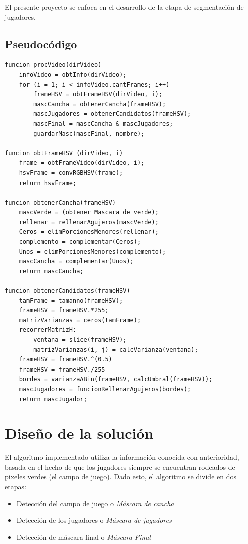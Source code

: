 \documentclass{IEEEtran}
\begin{document}
El presente proyecto se enfoca en el desarrollo de la etapa de segmentaci\'on de jugadores.

\subsection {Pseudoc\'odigo}
\begin{verbatim}
funcion procVideo(dirVideo)
	infoVideo = obtInfo(dirVideo);
	for (i = 1; i < infoVideo.cantFrames; i++)
		frameHSV = obtFrameHSV(dirVideo, i);
		mascCancha = obtenerCancha(frameHSV);
		mascJugadores = obtenerCandidatos(frameHSV);
		mascFinal = mascCancha & mascJugadores;
		guardarMasc(mascFinal, nombre);

funcion obtFrameHSV (dirVideo, i)
	frame = obtFrameVideo(dirVideo, i);
	hsvFrame = convRGBHSV(frame);
	return hsvFrame;

funcion obtenerCancha(frameHSV)
	mascVerde = (obtener Mascara de verde);
	rellenar = rellenarAgujeros(mascVerde);
	Ceros = elimPorcionesMenores(rellenar);
	complemento = complementar(Ceros);
	Unos = elimPorcionesMenores(complemento);
	mascCancha = complementar(Unos);
	return mascCancha;

funcion obtenerCandidatos(frameHSV)
	tamFrame = tamanno(frameHSV);
	frameHSV = frameHSV.*255;
	matrizVarianzas = ceros(tamFrame);
	recorrerMatrizH:
		ventana = slice(frameHSV);
		matrizVarianzas(i, j) = calcVarianza(ventana);
	frameHSV = frameHSV.^(0.5) 
	frameHSV = frameHSV./255 
	bordes = varianzaABin(frameHSV, calcUmbral(frameHSV));
	mascJugadores = funcionRellenarAgujeros(bordes);
	return mascJugador;
\end{verbatim}

\section{Dise\~no de la soluci\'on}

El algoritmo implementado utiliza la informaci\'on conocida con anterioridad, basada en el hecho de que los jugadores siempre se encuentran rodeados de pixeles verdes (el campo de juego). Dado esto, el algoritmo se divide en dos etapas:

\begin{itemize}
\item Detecci\'on del campo de juego o \emph{M\'ascara de cancha}
\item Detecci\'on de los jugadores o \emph{M\'ascara de jugadores}
\item Detecci\'on de m\'ascara final o \emph{M\'ascara Final}
\end{itemize}
\end{document}
